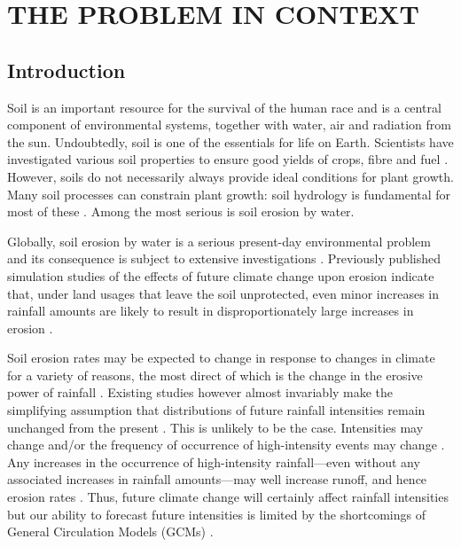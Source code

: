 \chapter{THE PROBLEM IN CONTEXT}
\label{sec:PROBLEMINTHECONTEXT}

\section{Introduction}
\label{sec:Rationale}
Soil is an important resource for the survival of the human race and is a
central component of environmental systems, together with water, air and
radiation from the sun. Undoubtedly, soil is one of the essentials for life on
Earth. Scientists have investigated various soil properties to ensure good
yields of crops, fibre and fuel \citep{cresser1993-192}. However, soils do not
necessarily always provide ideal conditions for plant growth. Many soil
processes can constrain plant growth: soil hydrology is fundamental for most of
these \citep{hudson1971-320, evans1980-mechanics, kirkby1980-1,
morgan1995-soil}. Among the most serious is soil erosion by water.

Globally, soil erosion by water is a serious present-day environmental problem
and its consequence is subject to extensive investigations
\citep{kirkby1980-1,morgan1995-soil}. Previously published simulation studies of
the effects of future climate change upon erosion indicate that, under land
usages that leave the soil unprotected, even minor increases in rainfall amounts
are likely to result in disproportionately large increases in erosion
\citep{kirkby1980-1, favis1995-365}.

Soil erosion rates may be expected to change in response to changes in climate
for a variety of reasons, the most direct of which is the change in the erosive
power of rainfall
\citep{favis1996-529,williams1996-381,favis1999-329,nearing2001-229,
pruski2002-climate}.
Existing studies however almost invariably make the simplifying assumption that
distributions of future rainfall intensities remain unchanged from the present
\citep{favis1995-265,favis1995-365}. This is unlikely to be the case.
Intensities may change and/or the frequency of occurrence of high-intensity
events may change \citep{houghton1996-climate, watson1998-517}. Any increases in
the occurrence of high-intensity rainfall---even without any associated
increases in rainfall amounts---may well increase runoff, and hence erosion
rates \citep{kirkby1980-1, morgan1995-soil, parsons2000-723}. Thus, future
climate change will certainly affect rainfall intensities but our ability to
forecast future intensities is limited by the shortcomings of General
Circulation Models (GCMs) \citep{favis1995-365}.

